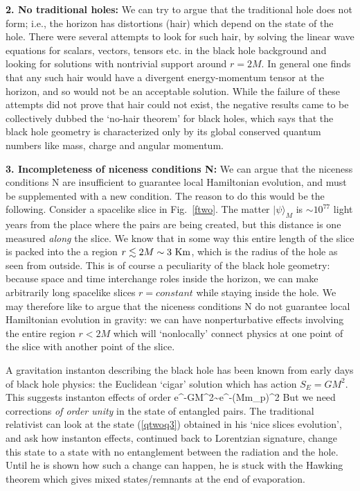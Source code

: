 \documentclass[12pt]{article}
\begin{document}
{\bf 2. No traditional holes:}  We can try to argue that the traditional hole does not form; i.e., the horizon has distortions (hair) which depend on the state of the hole. There were several attempts to look for such hair, by solving the linear wave equations for scalars, vectors, tensors etc. in the black hole background and looking for solutions with nontrivial support around $r=2M$. In general one finds that any such hair would have a divergent energy-momentum tensor at the horizon, and so would not be an acceptable solution. While the failure of these attempts did not prove that hair could not exist, the negative results came to be collectively dubbed the `no-hair theorem' for black holes, which says that the black hole geometry is characterized only by its global conserved quantum numbers like mass, charge and angular momentum.

\b

{\bf 3. Incompleteness of niceness conditions N:} We can argue that the niceness conditions N are insufficient to guarantee local Hamiltonian evolution, and must be supplemented with a new condition. The reason to do this would be the following. Consider a spacelike slice in Fig.~\ref{ftwo}. The matter $|\psi\rangle_M$ is $\sim 10^{77}$ light years from the place where the pairs are being created, but this  distance is one measured {\it along} the slice. We know that in some way this entire length of the slice is packed into the a  region $r\lesssim 2M\sim 3~{\rm Km}$, which is the radius of the hole as seen from outside. This is of course a peculiarity of the black hole geometry: because space and time interchange roles inside the horizon, we can make arbitrarily long spacelike slices $r=constant$ while staying inside the hole. We may therefore like to argue that the niceness conditions N do not guarantee local Hamiltonian evolution in gravity: we can have nonperturbative effects involving the entire region $r<2M$ which will `nonlocally' connect physics at one point of the slice with another point of the slice.

A gravitation instanton describing the black hole has been known from early days of black hole physics: the Euclidean `cigar' solution which has action
$
S_E=GM^2
\label{el}
$.
This suggests instanton effects of order
\be
 e^{-GM^2}\sim e^{-({M\over m_p})^2}
 \label{action}
\ee
But we need corrections {\it of order unity} in the state of entangled pairs. 
The traditional relativist can look at the state (\ref{qtwoq3}) obtained in his `nice slices evolution', and ask how instanton effects, continued back to Lorentzian signature, change this state to a state with no entanglement between the radiation and the hole. Until he is shown how such a change can happen, he is stuck with the Hawking theorem which gives mixed states/remnants at the end of evaporation.
\end{document}
